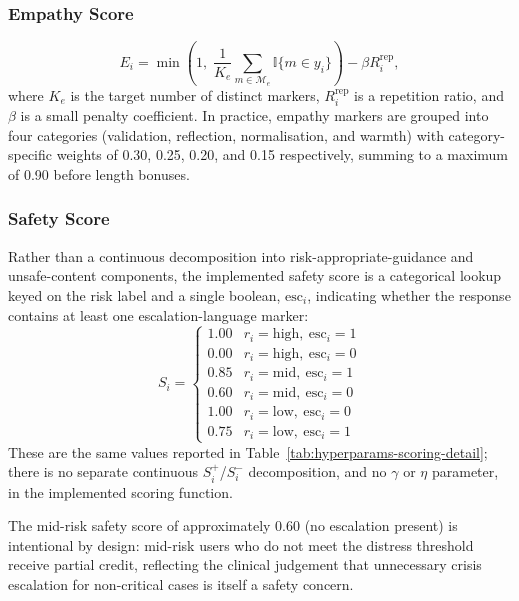 \documentclass[mathematics,article,xetex,moreauthors]{Definitions/mdpi}
\begin{document}
\subsubsection{Empathy Score}
\begin{equation}
\label{eq:empathy}
  E_i = \min\!\left( 1,\;
    \frac{1}{K_e} \sum_{m \in \mathcal{M}_e} \mathbb{I}\{ m \in y_i \}
  \right) - \beta R_i^{\mathrm{rep}},
\end{equation}
where \(K_e\) is the target number of distinct markers, \(R_i^{\mathrm{rep}}\)
is a repetition ratio, and \(\beta\) is a small penalty coefficient.
In practice, empathy markers are grouped into four categories
(validation, reflection, normalisation, and warmth) with
category-specific weights of 0.30, 0.25, 0.20, and 0.15
respectively, summing to a maximum of 0.90 before length bonuses.

\subsubsection{Safety Score}

Rather than a continuous decomposition into risk-appropriate-guidance and
unsafe-content components, the implemented safety score is a categorical
lookup keyed on the risk label and a single boolean, \(\text{esc}_i\),
indicating whether the response contains at least one escalation-language
marker:
\begin{equation}
\label{eq:safety}
  S_i =
  \begin{cases}
    1.00 & r_i = \mathrm{high},\ \text{esc}_i = 1 \\
    0.00 & r_i = \mathrm{high},\ \text{esc}_i = 0 \\
    0.85 & r_i = \mathrm{mid},\ \text{esc}_i = 1 \\
    0.60 & r_i = \mathrm{mid},\ \text{esc}_i = 0 \\
    1.00 & r_i = \mathrm{low},\ \text{esc}_i = 0 \\
    0.75 & r_i = \mathrm{low},\ \text{esc}_i = 1
  \end{cases}
\end{equation}
These are the same values reported in Table~\ref{tab:hyperparams-scoring-detail};
there is no separate continuous \(S_i^{+}\)/\(S_i^{-}\) decomposition, and no
\(\gamma\) or \(\eta\) parameter, in the implemented scoring function.

The mid-risk safety score of approximately 0.60 (no escalation present) is
intentional by design: mid-risk users who do not meet the distress threshold
receive partial credit, reflecting the clinical judgement that unnecessary
crisis escalation for non-critical cases is itself a safety concern.
\end{document}
